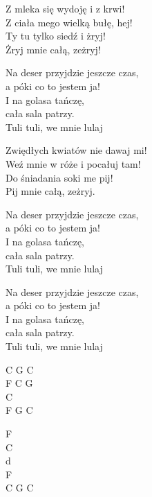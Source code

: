 \begin{text}
    Z mleka się wydoję i z krwi!\\
    Z ciała mego wielką bułę, hej!\\
    Ty tu tylko siedź i żryj!\\
    Żryj mnie całą, zeżryj!

    Na deser przyjdzie jeszcze czas,\\
    a póki co to jestem ja!\\
    I na golasa tańczę,\\
    cała sala patrzy.\\
    Tuli tuli, we mnie lulaj

    Zwiędłych kwiatów nie dawaj mi!\\
    Weź mnie w róże i pocałuj tam!\\
    Do śniadania soki me pij!\\
    Pij mnie całą, zeżryj.

    Na deser przyjdzie jeszcze czas,\\
    a póki co to jestem ja!\\
    I na golasa tańczę,\\
    cała sala patrzy.\\
    Tuli tuli, we mnie lulaj

    Na deser przyjdzie jeszcze czas,\\
    a póki co to jestem ja!\\
    I na golasa tańczę,\\
    cała sala patrzy.\\
    Tuli tuli, we mnie lulaj
\end{text}
\begin{chord}
    C G C\\
    F C G\\
    C\\
    F G C

    F\\
    C\\
    d\\
    F\\
    C G C
\end{chord}